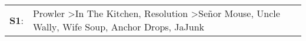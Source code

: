\begin{supertabular}{p{0.03\textwidth}p{0.92\textwidth}}
 \textbf{S1}:  &  Prowler\textsuperscript{} \textgreater \enspace In The Kitchen\textsuperscript{}, \enspace Resolution\textsuperscript{} \textgreater \enspace Señor Mouse\textsuperscript{}, \enspace Uncle Wally\textsuperscript{}, \enspace Wife Soup\textsuperscript{}, \enspace Anchor Drops\textsuperscript{}, \enspace JaJunk\textsuperscript{}  \enspace  \\
\end{supertabular}
